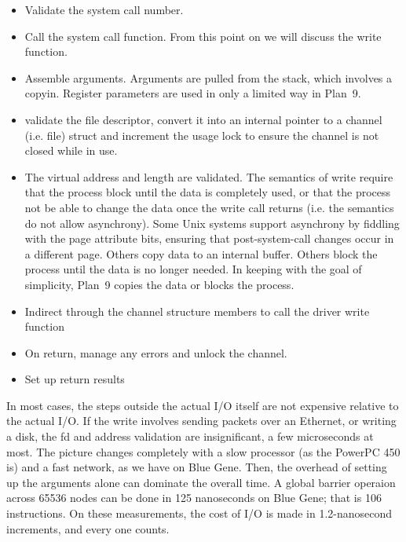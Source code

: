 \documentclass[letterpaper,twocolumn,10pt]{article}
\begin{document}
\begin{itemize}
\item Validate the system call number.
\item Call the system call function. From this point on we will discuss the write function. 
\item Assemble arguments. Arguments are pulled from the stack, which involves a copyin. Register parameters are used in only a limited way in Plan~9. 
\item validate the file descriptor, convert it into an internal pointer to a channel (i.e. file) struct and increment the usage lock to ensure the channel is not closed while in use. 
\item The virtual address and length are validated. The semantics of write require that the process block 
until the data is completely used, or that the process not be able to change the data once the write call returns (i.e. 
the semantics do not allow asynchrony). Some Unix systems support asynchrony by fiddling with the 
page attribute bits, ensuring that post-system-call changes occur in a different page. Others copy data to an internal buffer. Others block the process until the data is no longer needed. 
In keeping with the goal of simplicity, Plan~9 copies the data or blocks the process. 
\item Indirect through the channel structure members to call the driver write function
\item On return, manage any errors and unlock the channel. 
\item Set up return results
\end{itemize}

In most cases, the steps outside the actual I/O itself are not expensive relative to the actual I/O. If the write involves
sending packets over an Ethernet, or writing a disk, the fd and address validation are insignificant, a few microseconds at most. The picture changes completely with a slow processor (as the PowerPC 450 is) and a fast network, as we have on Blue Gene. Then, the overhead of setting up the arguments alone can dominate the overall time. A global barrier operaion across 65536 nodes can be done in 125 nanoseconds 
on Blue Gene; that is 106 instructions. On these measurements, the cost of I/O is made in 1.2-nanosecond increments, and every one counts. 
\end{document}
